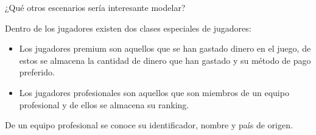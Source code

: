 \begin{frame}{¿Qu\'e otros escenarios ser\'ia interesante modelar?}
    \begin{block}{}
        Dentro de los {jugadores} existen dos clases especiales de jugadores:
        \begin{itemize}
            \item   Los {jugadores premium}
             son aquellos que se han gastado dinero en el juego, de estos se almacena
            la {cantidad de dinero que han gastado} y su m\'etodo de pago preferido.

            \item  Los {jugadores profesionales} son aquellos que {son miembros} de un
            {equipo profesional} y de ellos se almacena su {ranking}.
        \end{itemize}
        De un equipo profesional se conoce su {\color<2>{attr}identificador}, 
        {nombre} y {pa\'is} de origen.
      
        
     
    \end{block}
\end{frame}
